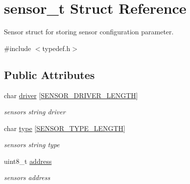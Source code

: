 \hypertarget{structsensor__t}{}\section{sensor\+\_\+t Struct Reference}
\label{structsensor__t}


Sensor struct for storing sensor configuration parameter.  




{\ttfamily \#include $<$typedef.\+h$>$}

\subsection*{Public Attributes}
\begin{DoxyCompactItemize}
\item 
\mbox{\label{structsensor__t_a9cb9a7d6b30b8aa990edc62c67e4bd0a}} 
char \hyperlink{structsensor__t_a9cb9a7d6b30b8aa990edc62c67e4bd0a}{driver} \mbox{[}\hyperlink{typedef_8h_aefa76b81b25c5e839e926d63dfc4763e}{S\+E\+N\+S\+O\+R\+\_\+\+D\+R\+I\+V\+E\+R\+\_\+\+L\+E\+N\+G\+TH}\mbox{]}
\begin{DoxyCompactList}\small\item\em sensor\textquotesingle{}s string driver \end{DoxyCompactList}\item 
\mbox{\label{structsensor__t_a4b9577960fd5c43358ea1660d8d3d324}} 
char \hyperlink{structsensor__t_a4b9577960fd5c43358ea1660d8d3d324}{type} \mbox{[}\hyperlink{typedef_8h_aa3ad4df04193064c9dfcd80b9aad7801}{S\+E\+N\+S\+O\+R\+\_\+\+T\+Y\+P\+E\+\_\+\+L\+E\+N\+G\+TH}\mbox{]}
\begin{DoxyCompactList}\small\item\em sensor\textquotesingle{}s string type \end{DoxyCompactList}\item 
\mbox{\label{structsensor__t_aa8e66f9050a38bb842b5a97cc3bc2358}} 
uint8\+\_\+t \hyperlink{structsensor__t_aa8e66f9050a38bb842b5a97cc3bc2358}{address}
\begin{DoxyCompactList}\small\item\em sensor\textquotesingle{}s address \end{DoxyCompactList}\item 
\mbox{\label{structsensor__t_a907c65079d3374ff1f18532cf41ccf13}} 

\end{DoxyCompactItemize}
